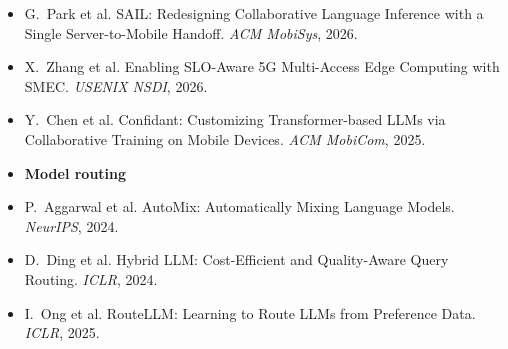 \begin{frame}
\begin{itemize}
\item G.~Park et al. SAIL: Redesigning Collaborative Language Inference with a Single Server-to-Mobile Handoff. \emph{ACM MobiSys}, 2026.
\item X.~Zhang et al. Enabling SLO-Aware 5G Multi-Access Edge Computing with SMEC. \emph{USENIX NSDI}, 2026.
\item Y.~Chen et al. Confidant: Customizing Transformer-based LLMs via Collaborative Training on Mobile Devices. \emph{ACM MobiCom}, 2025.
\item[] \textbf{Model routing}
\item P.~Aggarwal et al. AutoMix: Automatically Mixing Language Models. \emph{NeurIPS}, 2024.
\item D.~Ding et al. Hybrid LLM: Cost-Efficient and Quality-Aware Query Routing. \emph{ICLR}, 2024.
\item I.~Ong et al. RouteLLM: Learning to Route LLMs from Preference Data. \emph{ICLR}, 2025.
\end{itemize}
\end{frame}
